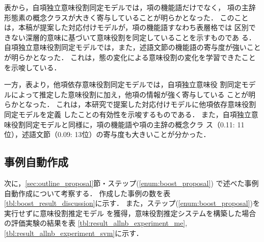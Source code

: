 \documentclass[japanese]{jnlp_1.2b}
\begin{document}
表{\thetablea}から，自項独立意味役割同定モデルでは，項の機能語だけでなく，
項の主辞形態素の概念クラスが大きく寄与していることが明らかとなった．
このことは，本稿が提案した対応付けモデルが，項の機能語すなわち表層格では
区別できない深層的意味に基づいて意味役割を同定していることを示すものであ
る．
自項独立意味役割同定モデルでは，また，述語文節の機能語の寄与度が強いこと
が明らかとなった．
これは，態の変化による意味役割の変化を学習できたことを示唆している．

一方，表{\thetableb}より，他項依存意味役割同定モデルでは，自項独立意味役
割同定モデルによって推定した意味役割に加え，他項の情報が強く寄与している
ことが明らかとなった．
これは，本研究で提案した対応付けモデルに他項依存意味役割同定モデルを定義
したことの有効性を示唆するものである．
また，自項独立意味役割同定モデルと同様に，項の機能語や項の主辞の概念クラ
ス（0.11: 11位），述語文節（0.09: 13位）の寄与度も大きいことが分かった．



\subsection*{事例自動作成}

次に，\ref{sec:outline_proposal}節・ステップ(\ref{enum:boost_proposal})
で述べた事例自動作成について考察する．
作成した事例の数を表\ref{tbl:boost_result_discussion}に示す．
また，ステップ(\ref{enum:boost_proposal})を実行せずに意味役割推定モデル
を獲得，意味役割推定システムを構築した場合の評価実験の結果を表
\ref{tbl:result_allnb_experiment_me},
\ref{tbl:result_allnb_experiment_svm}に示す．
\end{document}
